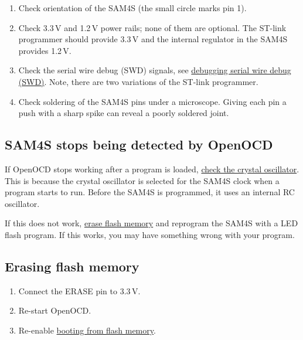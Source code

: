 %
\begin{enumerate}
\item
  Check orientation of the SAM4S (the small circle marks pin 1).

\item
  Check 3.3\,V and 1.2\,V power rails; none of them are optional.  The
  ST-link programmer should provide 3.3\,V and the internal regulator
  in the SAM4S provides 1.2\,V.

\item
  Check the serial wire debug (SWD) signals, see
  \protect\hyperref[debugging]{debugging serial wire debug (SWD)}.
  Note, there are two variations of the ST-link programmer.

\item
  Check soldering of the SAM4S pins under a microscope.  Giving
  each pin a push with a sharp spike can reveal a poorly soldered joint.

\end{enumerate}


\subsection{SAM4S stops being detected by OpenOCD}

If OpenOCD stops working after a program is loaded,
\protect\hyperref[checking-the-crystal-oscillator]{check the crystal
  oscillator}.  This is because the crystal oscillator is selected for
the SAM4S clock when a program starts to run.  Before the SAM4S is
programmed, it uses an internal RC oscillator.

If this does not work, \hyperref[erasing-flash-memory]{erase flash
  memory} and reprogram the SAM4S with a LED flash program.  If this
works, you may have something wrong with your program.


\subsection{Erasing flash memory}
\label{erasing-flash-memory}

\begin{enumerate}
\item Connect the ERASE pin to 3.3\,V.

\item Re-start OpenOCD.

\item Re-enable \hyperref[booting-from-flash-memory]{booting from
  flash memory}.
\end{enumerate}


